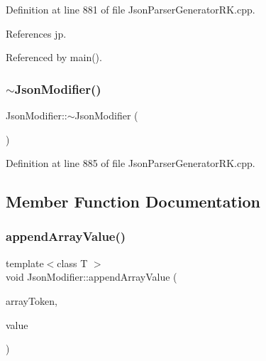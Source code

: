 Definition at line 881 of file Json\+Parser\+Generator\+R\+K.\+cpp.



References jp.



Referenced by main().

\mbox{\label{class_json_modifier_a68e9b6a5b88ad4316fd1cb443cc0b11e}} 
\subsubsection{\texorpdfstring{$\sim$\+Json\+Modifier()}{~JsonModifier()}}
{\footnotesize\ttfamily Json\+Modifier\+::$\sim$\+Json\+Modifier (\begin{DoxyParamCaption}{ }\end{DoxyParamCaption})\hspace{0.3cm}{\ttfamily [virtual]}}



Definition at line 885 of file Json\+Parser\+Generator\+R\+K.\+cpp.



\subsection{Member Function Documentation}
\mbox{\label{class_json_modifier_ac492f5945ef4e4bc003fea5af5b9c504}} 
\subsubsection{\texorpdfstring{append\+Array\+Value()}{appendArrayValue()}}
{\footnotesize\ttfamily template$<$class T $>$ \\
void Json\+Modifier\+::append\+Array\+Value (\begin{DoxyParamCaption}\item[{const \hyperlink{struct_json_parser_generator_r_k_1_1jsmntok__t}{Json\+Parser\+Generator\+R\+K\+::jsmntok\+\_\+t} $\ast$}]{array\+Token,  }\item[{T}]{value }\end{DoxyParamCaption})\hspace{0.3cm}{\ttfamily [inline]}}



